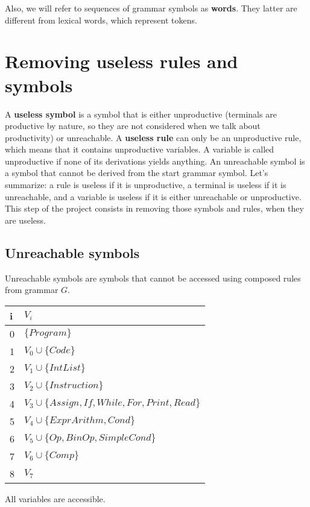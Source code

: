 \documentclass[12pt]{report}
\begin{document}
Also, we will refer to sequences of grammar symbols as \textbf{words}. They latter are different from lexical words, which represent tokens.


\section{Removing useless rules and symbols}

A \textbf{useless symbol} is a symbol that is either unproductive (terminals are productive by nature, so they are not considered when we talk about productivity) or unreachable. A \textbf{useless rule} can only be an unproductive rule, which means that it contains
unproductive variables. A variable is called unproductive if none of its derivations yields anything. An unreachable symbol is a symbol that cannot be derived
from the start grammar symbol. Let's summarize: a rule is useless if it is unproductive, a terminal is useless if it is unreachable, and a variable is useless if it is either unreachable or unproductive. This step of the project consists in removing those symbols and rules, when they are useless.

\subsection{Unreachable symbols}

Unreachable symbols are symbols that cannot be accessed using composed rules from grammar $G$.

\begin{tabular}{|l p{35em}|} \hline
   i & $V_i$ \\ \hline
  0 & $\{Program\}$ \\ \hline
  1 & $V_0 \cup \{Code\}$ \\ \hline
  2 & $V_1 \cup \{IntList\}$ \\ \hline
  3 & $V_2 \cup \{Instruction\}$ \\ \hline
  4 & $V_3 \cup \{Assign, If, While, For, Print, Read\}$ \\ \hline
  5 & $V_4 \cup \{ExprArithm, Cond\}$ \\ \hline
  6 & $V_5 \cup \{Op, BinOp, SimpleCond\}$ \\ \hline
  7 & $V_6 \cup \{Comp\}$ \\ \hline
  8 & $V_7$ \\ \hline
\end{tabular}

All variables are accessible.
\end{document}
